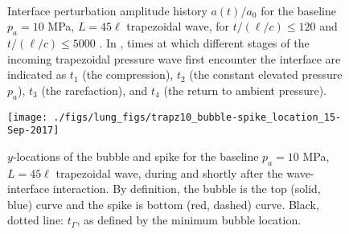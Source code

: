 \documentclass{jfm}%
\begin{document}
% 
\begin{figure} 
  \centering
  \begin{subfigure}[b]{0.45\textwidth}
    \centering
    \label{fig:trapz10_interface25}
  \end{subfigure}
  ~
  \begin{subfigure}[b]{0.45\textwidth}
    \centering
    \label{fig:trapz10_interface1000}
  \end{subfigure}
  \caption{\label{fig:trapz10_interface}Interface perturbation amplitude history
    $a(t)/a_0$ for the baseline $p_a = 10$ MPa, $L=45\ell$ trapezoidal
    wave, for $t/(\ell/c) \leq 120$ \protect{}
    and $t/(\ell/c) \leq 5000$ \protect{}. In
    \protect{}, times at which different
    stages of the incoming trapezoidal pressure wave first encounter
    the interface are indicated as $t_1$ (the compression), $t_2$ (the
    constant elevated pressure $p_a$), $t_3$ (the rarefaction), and
    $t_4$ (the return to ambient pressure).}
\end{figure}\par



\begin{figure}%
  \texttt{[image: ./figs/lung\_figs/trapz10\_bubble-spike\_location\_15-Sep-2017]}
  \caption{\label{fig:trapz10_bs_location}$y$-locations of the bubble and spike for the baseline
    $p_a = 10$ MPa, $L=45\ell$ trapezoidal wave, during and shortly after the
    wave-interface interaction. By definition, the bubble is the top
    (solid, blue) curve and the spike is bottom (red, dashed)
    curve. Black, dotted line: $t_\Gamma$, as defined by the minimum
    bubble location.}  
\end{figure}%
\end{document}
